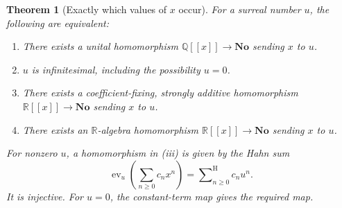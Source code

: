 \documentclass[11pt,letterpaper]{article}
\newtheorem{theorem}{Theorem}[section]
\theoremstyle{definition}
\theoremstyle{remark}
\newcommand{\No}{\mathbf{No}}
\newcommand{\R}{\mathbb R}
\newcommand{\Q}{\mathbb Q}
\newcommand{\ev}{\operatorname{ev}}
\newcommand{\seqsum}{\mathop{\sum}\nolimits^{\mathrm H}}
\begin{document}
\begin{theorem}[Exactly which values of $x$ occur]\label{thm:exact}
For a surreal number $u$, the following are equivalent:
\begin{enumerate}[label=(\roman*)]
\item There exists a unital homomorphism $\Q[[x]]\to\No$ sending $x$ to $u$.
\item $u$ is infinitesimal, including the possibility $u=0$.
\item There exists a coefficient-fixing, strongly additive homomorphism
$\R[[x]]\to\No$ sending $x$ to $u$.
\item There exists an $\R$-algebra homomorphism $\R[[x]]\to\No$ sending $x$
to $u$.
\end{enumerate}
For nonzero $u$, a homomorphism in (iii) is given by the Hahn sum
\begin{equation}\label{eq:ev}
 \ev_u\left(\sum_{n\ge0}c_nx^n\right)=\seqsum_{n\ge0}c_nu^n.
\end{equation}
It is injective. For $u=0$, the constant-term map gives the required map.
\end{theorem}
\end{document}
